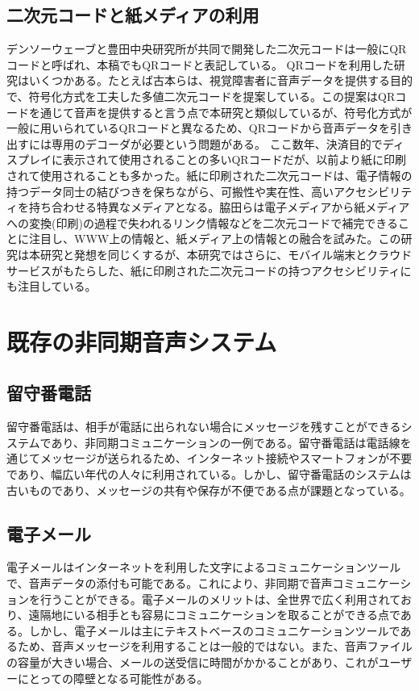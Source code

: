 \documentclass[submit,techrep,noauthor]{ipsj}
\begin{document}
\subsection{二次元コードと紙メディアの利用}
デンソーウェーブと豊田中央研究所が共同で開発した二次元コード\cite{qr-patent}は一般にQRコード\cite{qr-jis}と呼ばれ、本稿でもQRコードと表記している。
QRコードを利用した研究はいくつかある。たとえば古本ら\cite{qr-1}は、視覚障害者に音声データを提供する目的で、符号化方式を工夫した多値二次元コードを提案している。この提案はQRコードを通じて音声を提供すると言う点で本研究と類似しているが、符号化方式が一般に用いられているQRコードと異なるため、QRコードから音声データを引き出すには専用のデコーダが必要という問題がある。
ここ数年、決済目的でディスプレイに表示されて使用されることの多い\cite{white_paper_infor_commun_japan-2}QRコードだが、以前より紙に印刷されて使用されることも多かった。紙に印刷された二次元コードは、電子情報の持つデータ同士の結びつきを保ちながら、可搬性や実在性、高いアクセシビリティを持ち合わせる特異なメディアとなる。脇田ら\cite{qr-2}は電子メディアから紙メディアへの変換(印刷)の過程で失われるリンク情報などを二次元コードで補完できることに注目し、WWW上の情報と、紙メディア上の情報との融合を試みた。この研究は本研究と発想を同じくするが、本研究ではさらに、モバイル端末とクラウドサービスがもたらした、紙に印刷された二次元コードの持つアクセシビリティにも注目している。

\section{既存の非同期音声システム}

\subsection{留守番電話}
留守番電話は、相手が電話に出られない場合にメッセージを残すことができるシステムであり、非同期コミュニケーションの一例である。留守番電話は電話線を通じてメッセージが送られるため、インターネット接続やスマートフォンが不要であり、幅広い年代の人々に利用されている。しかし、留守番電話のシステムは古いものであり、メッセージの共有や保存が不便である点が課題となっている。

\subsection{電子メール}
電子メールはインターネットを利用した文字によるコミュニケーションツールで、音声データの添付も可能である。これにより、非同期で音声コミュニケーションを行うことができる。電子メールのメリットは、全世界で広く利用されており、遠隔地にいる相手とも容易にコミュニケーションを取ることができる点である。しかし、電子メールは主にテキストベースのコミュニケーションツールであるため、音声メッセージを利用することは一般的ではない。また、音声ファイルの容量が大きい場合、メールの送受信に時間がかかることがあり、これがユーザーにとっての障壁となる可能性がある。
\end{document}

